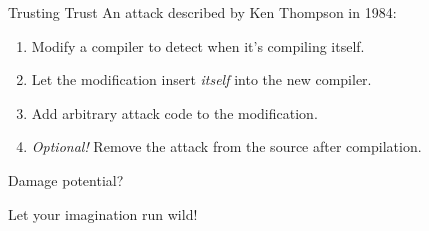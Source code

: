 \documentclass[12pt]{beamer}
\begin{document}

  \begin{frame}{Trusting Trust}
    An attack described by Ken Thompson in 1984:

    \begin{enumerate}
    \item Modify a compiler to detect when it's compiling itself.
    \item Let the modification insert \textit{itself} into the new compiler.
    \item Add arbitrary attack code to the modification.
    \item \textit{Optional!} Remove the attack from the source after compilation.
    \end{enumerate}
  \end{frame}

  \begin{frame}{Damage potential?}
    \begin{center}
      Let your imagination run wild!
    \end{center}
  \end{frame}
\end{document}
